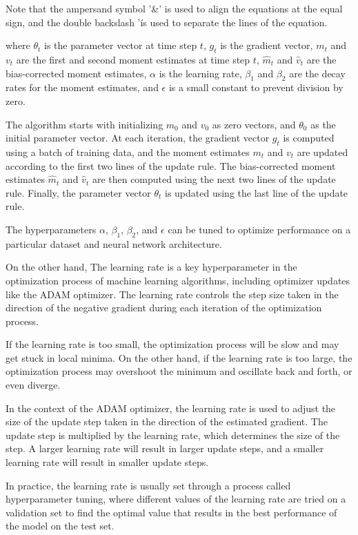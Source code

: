 Note that the ampersand symbol '&' is used to align the equations at the equal sign, and the double backslash '\' is used to separate the lines of the equation.

where $\theta_t$ is the parameter vector at time step $t$, $g_t$ is the gradient vector, $m_t$ and $v_t$ are the first and second moment estimates at time step $t$, $\hat{m}_t$ and $\hat{v}_t$ are the bias-corrected moment estimates, $\alpha$ is the learning rate, $\beta_1$ and $\beta_2$ are the decay rates for the moment estimates, and $\epsilon$ is a small constant to prevent division by zero.

The algorithm starts with initializing $m_0$ and $v_0$ as zero vectors, and $\theta_0$ as the initial parameter vector. At each iteration, the gradient vector $g_t$ is computed using a batch of training data, and the moment estimates $m_t$ and $v_t$ are updated according to the first two lines of the update rule. The bias-corrected moment estimates $\hat{m}_t$ and $\hat{v}_t$ are then computed using the next two lines of the update rule. Finally, the parameter vector $\theta_t$ is updated using the last line of the update rule.

The hyperparameters $\alpha$, $\beta_1$, $\beta_2$, and $\epsilon$ can be tuned to optimize performance on a particular dataset and neural network architecture.

On the other hand, The learning rate is a key hyperparameter in the optimization process of machine learning algorithms, including optimizer updates like the ADAM optimizer. The learning rate controls the step size taken in the direction of the negative gradient during each iteration of the optimization process.

If the learning rate is too small, the optimization process will be slow and may get stuck in local minima. On the other hand, if the learning rate is too large, the optimization process may overshoot the minimum and oscillate back and forth, or even diverge.

In the context of the ADAM optimizer, the learning rate is used to adjust the size of the update step taken in the direction of the estimated gradient. The update step is multiplied by the learning rate, which determines the size of the step. A larger learning rate will result in larger update steps, and a smaller learning rate will result in smaller update steps.

In practice, the learning rate is usually set through a process called hyperparameter tuning, where different values of the learning rate are tried on a validation set to find the optimal value that results in the best performance of the model on the test set.


